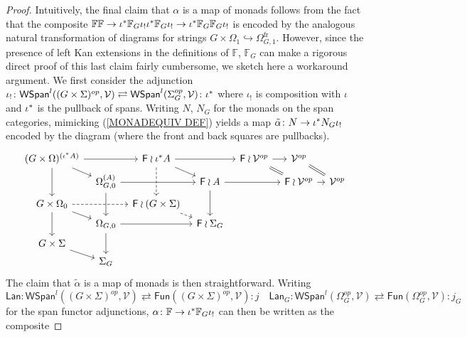 \documentclass[a4paper,10pt]{article}%
\begin{document}
\begin{proof}
  Intuitively, the final claim that 
  $\alpha$ is a map of monads 
  follows from the fact that the composite 
  $
  \mathbb{F} \mathbb{F}
  \to 
  \iota^{\**} \mathbb{F}_G \iota_{!} \iota^{\**} \mathbb{F}_G \iota_{!}
  \to
  \iota^{\**} \mathbb{F}_G \mathbb{F}_G \iota_{!}
  $
  is encoded by the analogous natural transformation of diagrams for strings $G \times \Omega_1 \hookrightarrow \Omega_{G,1}^{\text{fr}}$.
  However, since the presence of left Kan extensions in the 
  definitions of $\mathbb{F}$, $\mathbb{F}_G$
  can make a rigorous direct proof of this last claim fairly cumbersome, we sketch here a workaround argument.
  We first consider the adjunction
  $
  \iota_{!} \colon
  \mathsf{WSpan}^l((G\times \Sigma)^{op},\mathcal{V})
  \rightleftarrows
  \mathsf{WSpan}^l(\Sigma_G^{op},\mathcal{V})
  \colon \iota^{\**}
  $
  where $\iota_!$ is composition with $\iota$ and $\iota^{\**}$ is the pullback of spans. 
  Writing $N$, $N_G$ for the monads 
  on the span categories, mimicking (\ref{MONADEQUIV DEF}) yields
  a map 
  $\tilde{\alpha} \colon N \to \iota^{\**} N_G \iota_{!}$
  encoded by the diagram (where the front and back squares are pullbacks).
  \[
  \begin{tikzcd}[row sep=3pt, column sep =8pt]
    (G \times \Omega)^{(\iota^{\**} A)}	\ar{dd} \ar{rd} \ar{rr} &&
    \Fin \wr \iota^{\**} A \ar{rd} \ar[dashed]{dd} \ar{rr}&&
    \Fin \wr \mathcal{V}^{op} \ar{r} \ar[equal]{rd} &
    \mathcal{V}^{op} \ar[equal]{rd}
    \\
    & \Omega_{G,0}^{(A)} \ar{dd} \ar{rr} &&
    \Fin \wr A \ar{dd} \ar{rr} &&
    \Fin \wr \mathcal{V}^{op} \ar{r} &
    \mathcal{V}^{op}
    \\
    G \times \Omega_0	\ar{dd} \ar{rd} \ar[dashed]{rr}&&
    \Fin \wr (G \times \Sigma) \ar[dashed]{rd}
    \\
    & \Omega_{G,0} \ar{dd} \ar{rr} &&
    \Fin \wr \Sigma_G
    \\
    G \times \Sigma \ar{rd}
    \\
    & \Sigma_{G}
  \end{tikzcd}
  \]
  The claim that $\tilde{\alpha}$ is a map of monads is then straightforward. Writing
  \[
  \mathsf{Lan} \colon
  \mathsf{WSpan}^l((G\times \Sigma)^{op},\mathcal{V})
  \rightleftarrows
  \mathsf{Fun}((G\times \Sigma)^{op},\mathcal{V})
  \colon j
  \quad
  \mathsf{Lan}_G \colon
  \mathsf{WSpan}^l(\Omega_G^{op},\mathcal{V})
  \rightleftarrows
  \mathsf{Fun}(\Omega_G^{op},\mathcal{V})
  \colon j_G
  \]
  for the span functor adjunctions,  
  $\alpha \colon \mathbb{F} \to \iota^{\**} \mathbb{F}_G \iota_{!}$ can then be written as the composite

\end{proof}
\end{document}
